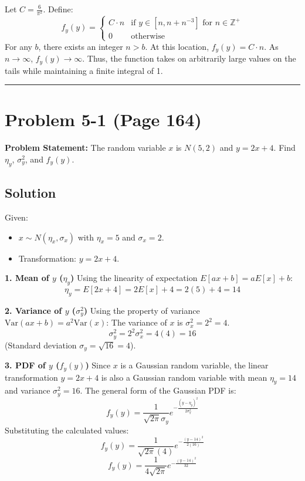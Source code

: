 \documentclass{article}
\begin{document}
Let $C = \frac{6}{\pi^2}$. Define:
\[ f_y(y) = \begin{cases} C \cdot n & \text{if } y \in [n, n + n^{-3}] \text{ for } n \in \mathbb{Z}^+ \\ 0 & \text{otherwise} \end{cases} \]
For any $b$, there exists an integer $n > b$. At this location, $f_y(y) = C \cdot n$. As $n \to \infty$, $f_y(y) \to
	\infty$. Thus, the function takes on arbitrarily large values on the tails while maintaining a finite integral of 1.

\vspace{1cm}
\hrule
\vspace{1cm}

\section*{Problem 5-1 (Page 164)}

\textbf{Problem Statement:}
The random variable $x$ is $N(5, 2)$ and $y = 2x + 4$. Find $\eta_y$, $\sigma_y^2$, and $f_y(y)$.

\subsection*{Solution}

Given:
\begin{itemize}
	\item $x \sim N(\eta_x, \sigma_x)$ with $\eta_x = 5$ and $\sigma_x = 2$.
	\item Transformation: $y = 2x + 4$.
\end{itemize}

\textbf{1. Mean of $y$ ($\eta_y$)}
Using the linearity of expectation $E[ax+b] = aE[x] + b$:
\[ \eta_y = E[2x + 4] = 2E[x] + 4 = 2(5) + 4 = 14 \]

\textbf{2. Variance of $y$ ($\sigma_y^2$)}
Using the property of variance $\text{Var}(ax+b) = a^2 \text{Var}(x)$:
The variance of $x$ is $\sigma_x^2 = 2^2 = 4$.
\[ \sigma_y^2 = 2^2 \sigma_x^2 = 4(4) = 16 \]
(Standard deviation $\sigma_y = \sqrt{16} = 4$).

\textbf{3. PDF of $y$ ($f_y(y)$)}
Since $x$ is a Gaussian random variable, the linear transformation $y = 2x+4$ is also a Gaussian random variable with mean $\eta_y = 14$ and variance $\sigma_y^2 = 16$.
The general form of the Gaussian PDF is:
\[ f_y(y) = \frac{1}{\sqrt{2\pi}\sigma_y} e^{-\frac{(y - \eta_y)^2}{2\sigma_y^2}} \]
Substituting the calculated values:
\[ f_y(y) = \frac{1}{\sqrt{2\pi}(4)} e^{-\frac{(y - 14)^2}{2(16)}} \]
\[ f_y(y) = \frac{1}{4\sqrt{2\pi}} e^{-\frac{(y - 14)^2}{32}} \]
\end{document}

